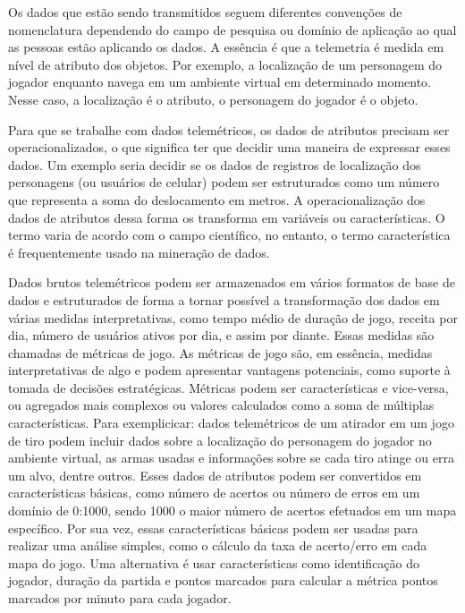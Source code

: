 Os dados que estão sendo transmitidos seguem diferentes convenções de nomenclatura dependendo do campo de pesquisa ou domínio de aplicação ao qual as pessoas estão aplicando os dados. A essência é que a telemetria é medida em nível de atributo dos objetos. Por exemplo, a localização de um personagem do jogador enquanto navega em um ambiente virtual em determinado momento. Nesse caso, a localização é o atributo, o personagem do jogador é o objeto.

Para que se trabalhe com dados telemétricos, os dados de atributos precisam ser operacionalizados, o que significa ter que decidir uma maneira de expressar esses dados. Um exemplo seria decidir se os dados de registros de localização dos personagens (ou usuários de celular) podem ser estruturados como um número que representa a soma do deslocamento em metros. A operacionalização dos dados de atributos dessa forma os transforma em variáveis ou características. O termo varia de acordo com o campo científico, no entanto, o termo característica é frequentemente usado na mineração de dados.

Dados brutos telemétricos podem ser armazenados em vários formatos de base de dados e estruturados de forma a tornar possível a transformação dos dados em várias medidas interpretativas, como tempo médio de duração de jogo, receita por dia, número de usuários ativos por dia, e assim por diante. Essas medidas são chamadas de métricas de jogo. As métricas de jogo são, em essência, medidas interpretativas de algo e podem apresentar vantagens potenciais, como suporte à tomada de decisões estratégicas. Métricas podem ser características e vice-versa, ou agregados mais complexos ou valores calculados como a soma de múltiplas características. Para exemplicicar: dados telemétricos de um atirador em um jogo de tiro podem incluir dados sobre a localização do personagem do jogador no ambiente virtual, as armas usadas e informações sobre se cada tiro atinge ou erra um alvo, dentre outros. Esses dados de atributos podem ser convertidos em características básicas, como número de acertos ou número de erros em um domínio de 0:1000, sendo 1000 o maior número de acertos efetuados em um mapa específico. Por sua vez, essas características básicas podem ser usadas para realizar uma análise simples, como o cálculo da taxa de acerto/erro em cada mapa do jogo. Uma alternativa é usar características como identificação do jogador, duração da partida e pontos marcados para calcular a métrica pontos marcados por minuto para cada jogador.

